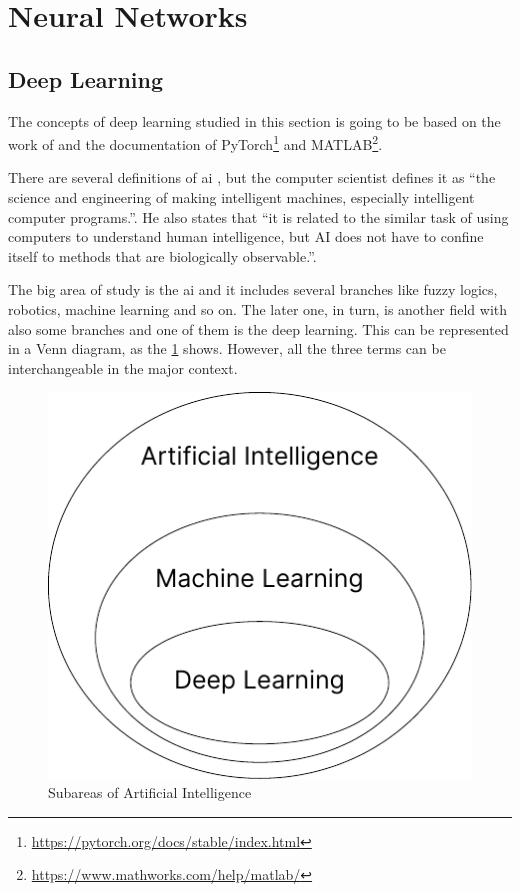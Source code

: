 \section{Neural Networks}

\subsection{Deep Learning}

The concepts of deep learning studied in this section is going to be based on the work of \citet{goodfellow2016} and the documentation of PyTorch\footnote{\url{https://pytorch.org/docs/stable/index.html}} and MATLAB\footnote{\url{https://www.mathworks.com/help/matlab/}}.

There are several definitions of \gls*{ai} \citep{winston1992}, but the  computer scientist \citet{mccarthy2007} defines it as ``the science and engineering of making intelligent machines, especially intelligent computer programs.''.
He also states that ``it is related to the similar task of using computers to understand human intelligence, but AI does not have to confine itself to methods that are biologically observable.''.

The big area of study is the \gls*{ai} and it includes several branches like fuzzy logics, robotics, machine learning and so on. 
The later one, in turn, is another field with also some branches and one of them is the deep learning.
This can be represented in a Venn diagram, as the \cref{fig:venn_dl} shows.
However, all the three terms can be interchangeable in the major context.

\begin{figure}[H]
    \centering
    \includegraphics{figures/2methodology/nn/venn_dl.pdf}
    \caption{Subareas of Artificial Intelligence}
    \label{fig:venn_dl}
\end{figure}

